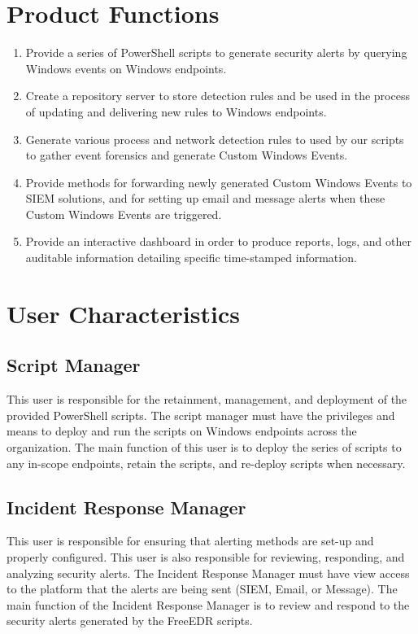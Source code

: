 \documentclass{scrreprt}
\begin{document}
\section{Product Functions}

\begin{enumerate}
\item Provide a series of PowerShell scripts to generate security alerts by querying Windows events on Windows endpoints.
\item Create a repository server to store detection rules and be used in the process of updating and delivering new rules to Windows endpoints.
\item Generate various process and network detection rules to used by our scripts to gather event forensics and generate Custom Windows Events.
\item Provide methods for forwarding newly generated Custom Windows Events to SIEM solutions, and for setting up email and message alerts when these Custom Windows Events are triggered.
\item Provide an interactive dashboard in order to produce reports, logs, and other auditable information detailing specific time-stamped information.

\end{enumerate}

\section{User Characteristics}

\subsection{Script Manager}
This user is responsible for the retainment, management, and deployment of the provided PowerShell scripts. The script manager must have the privileges and means to deploy and run the scripts on Windows endpoints across the organization. The main function of this user is to deploy the series of scripts to any in-scope endpoints, retain the scripts, and re-deploy scripts when necessary.

\subsection{Incident Response Manager}

This user is responsible for ensuring that alerting methods are set-up and properly configured. This user is also responsible for reviewing, responding, and analyzing security alerts. The Incident Response Manager must have view access to the platform that the alerts are being sent (SIEM, Email, or Message). The main function of the Incident Response Manager is to review and respond to the security alerts generated by the FreeEDR scripts.
\end{document}
